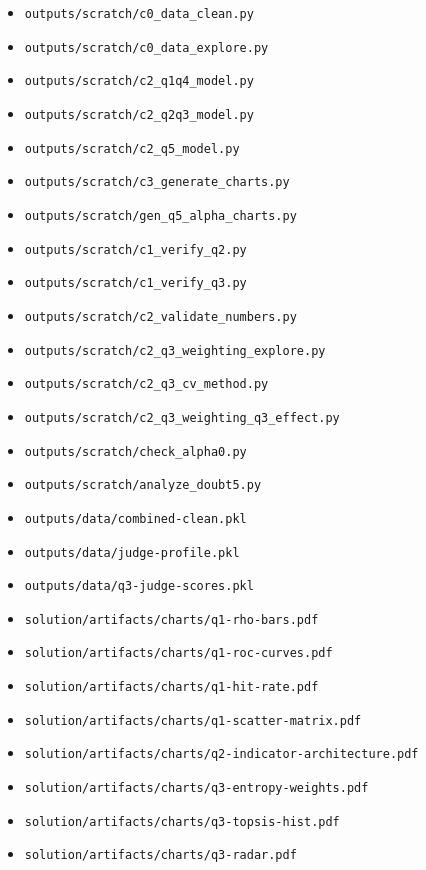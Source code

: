 \documentclass[UTF8,12pt]{ctexart}
\begin{document}
\begin{itemize}[leftmargin=*,itemsep=0pt]
    \item \texttt{outputs/scratch/c0\_data\_clean.py}
    \item \texttt{outputs/scratch/c0\_data\_explore.py}
    \item \texttt{outputs/scratch/c2\_q1q4\_model.py}
    \item \texttt{outputs/scratch/c2\_q2q3\_model.py}
    \item \texttt{outputs/scratch/c2\_q5\_model.py}
    \item \texttt{outputs/scratch/c3\_generate\_charts.py}
    \item \texttt{outputs/scratch/gen\_q5\_alpha\_charts.py}
    \item \texttt{outputs/scratch/c1\_verify\_q2.py}
    \item \texttt{outputs/scratch/c1\_verify\_q3.py}
    \item \texttt{outputs/scratch/c2\_validate\_numbers.py}
    \item \texttt{outputs/scratch/c2\_q3\_weighting\_explore.py}
    \item \texttt{outputs/scratch/c2\_q3\_cv\_method.py}
    \item \texttt{outputs/scratch/c2\_q3\_weighting\_q3\_effect.py}
    \item \texttt{outputs/scratch/check\_alpha0.py}
    \item \texttt{outputs/scratch/analyze\_doubt5.py}
    \item \texttt{outputs/data/combined-clean.pkl}
    \item \texttt{outputs/data/judge-profile.pkl}
    \item \texttt{outputs/data/q3-judge-scores.pkl}
    \item \texttt{solution/artifacts/charts/q1-rho-bars.pdf}
    \item \texttt{solution/artifacts/charts/q1-roc-curves.pdf}
    \item \texttt{solution/artifacts/charts/q1-hit-rate.pdf}
    \item \texttt{solution/artifacts/charts/q1-scatter-matrix.pdf}
    \item \texttt{solution/artifacts/charts/q2-indicator-architecture.pdf}
    \item \texttt{solution/artifacts/charts/q3-entropy-weights.pdf}
    \item \texttt{solution/artifacts/charts/q3-topsis-hist.pdf}
    \item \texttt{solution/artifacts/charts/q3-radar.pdf}

\end{itemize}
\end{document}
